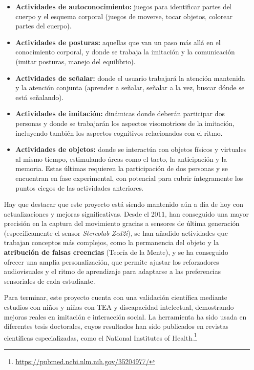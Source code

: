 \documentclass[12pt,twoside,titlepage]{report}
\begin{document}
\begin{enumerate}[label=\textbf{\arabic*.}, leftmargin=1.5cm, itemsep=0.5em]
    \begin{itemize}[leftmargin=1.5cm, labelsep=0.5em, itemsep=0.5em]
        \item \textbf{Actividades de autoconocimiento:} juegos para identificar partes del cuerpo y el esquema corporal (juegos de moverse, tocar objetos, colorear partes del cuerpo).
        \item \textbf{Actividades de posturas:} aquellas que van un paso más allá en el conocimiento corporal, y donde se trabaja la imitación y la comunicación (imitar posturas, manejo del equilibrio).
        \item \textbf{Actividades de señalar:} donde el usuario trabajará la atención mantenida y la atención conjunta (aprender a señalar, señalar a la vez, buscar dónde se está señalando).
        \item \textbf{Actividades de imitación:} dinámicas donde deberán participar dos personas y donde se trabajarán los aspectos visomotrices de la imitación, incluyendo también los aspectos cognitivos relacionados con el ritmo.
        \item \textbf{Actividades de objetos:} donde se interactúa con objetos físicos y virtuales al mismo tiempo, estimulando áreas como el tacto, la anticipación y la memoria.
Estas últimas requieren la participación de dos personas y se encuentran en fase experimental, con potencial para cubrir íntegramente los puntos ciegos de las actividades anteriores.
    \end{itemize}

Hay que destacar que este proyecto está siendo mantenido aún a día de hoy con actualizaciones y mejoras significativas.
Desde el 2011, han conseguido una mayor precisión en la captura del movimiento gracias a sensores de última generación (específicamente el sensor \textit{Stereolab Zed2i}), se han añadido actividades que trabajan conceptos más complejos, como la permanencia del objeto y la \textbf{atribución de falsas creencias} (Teoría de la Mente), y se ha conseguido ofrecer una amplia personalización, que permite ajustar los reforzadores audiovisuales y el ritmo de aprendizaje para adaptarse a las preferencias sensoriales de cada estudiante.

Para terminar, este proyecto cuenta con una validación científica mediante estudios con niños y niñas con TEA y discapacidad intelectual, demostrando mejoras reales en imitación e interacción social.
La herramienta ha sido usada en diferentes tesis doctorales, cuyos resultados han sido publicados en revistas científicas especializadas, como el National Institutes of Health.\footnote{\url{https://pubmed.ncbi.nlm.nih.gov/35204977/}}


\end{enumerate}
\end{document}
